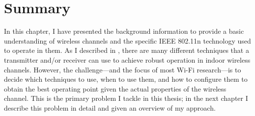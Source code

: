 \section{Summary}
In this chapter, I have presented the background information to provide a basic understanding of wireless channels and the specific IEEE 802.11n technology used to operate in them. As I described in , there are many different techniques that a transmitter and/or receiver can use to achieve robust operation in indoor wireless channels. However, the challenge---and the focus of most Wi-Fi research---is to decide which techniques to use, when to use them, and how to configure them to obtain the best operating point given the actual properties of the wireless channel. This is the primary problem I tackle in this thesis; in the next chapter I describe this problem in detail and given an overview of my approach.

\ifx\mainfile\undefined

\fi

